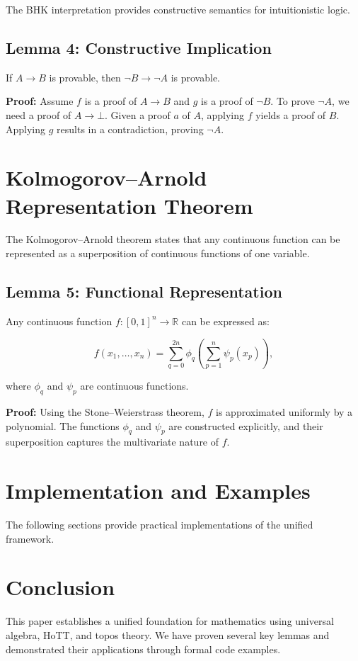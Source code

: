 \documentclass{article}
\begin{document}
The BHK interpretation provides constructive semantics for intuitionistic logic.

\subsection{Lemma 4: Constructive Implication}
If \( A \rightarrow B \) is provable, then \( \neg B \rightarrow \neg A \) is provable.

\textbf{Proof:}
Assume \( f \) is a proof of \( A \rightarrow B \) and \( g \) is a proof of \( \neg B \). To prove \( \neg A \), we need a proof of \( A \rightarrow \bot \). Given a proof \( a \) of \( A \), applying \( f \) yields a proof of \( B \). Applying \( g \) results in a contradiction, proving \( \neg A \).


\section{Kolmogorov–Arnold Representation Theorem}

The Kolmogorov–Arnold theorem states that any continuous function can be represented as a superposition of continuous functions of one variable.

\subsection{Lemma 5: Functional Representation}
Any continuous function \( f: [0, 1]^n \rightarrow \mathbb{R} \) can be expressed as:

\[
f(x_1, \dots, x_n) = \sum_{q=0}^{2n} \phi_q\left(\sum_{p=1}^{n} \psi_p(x_p)\right),
\]

where \( \phi_q \) and \( \psi_p \) are continuous functions.

\textbf{Proof:} Using the Stone–Weierstrass theorem, \( f \) is approximated uniformly by a polynomial. The functions \( \phi_q \) and \( \psi_p \) are constructed explicitly, and their superposition captures the multivariate nature of \( f \).


\section{Implementation and Examples}

The following sections provide practical implementations of the unified framework.

\section{Conclusion}

This paper establishes a unified foundation for mathematics using universal algebra, HoTT, and topos theory. We have proven several key lemmas and demonstrated their applications through formal code examples.
\end{document}

